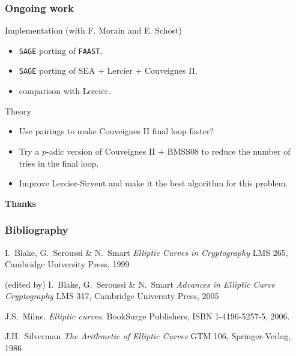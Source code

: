 \documentclass[10pt]{beamer}
\newcommand{\0}{\mathcal{O}}  %
\begin{document}
\begin{frame}
  \frametitle{Ongoing work}

  \begin{block}{Implementation (with F. Morain and E. Schost)}
    \begin{itemize}
    \item \texttt{SAGE} porting of \texttt{FAAST},
    \item \texttt{SAGE} porting of SEA + Lercier + Couveignes II,
    \item comparison with Lercier.
    \end{itemize}
  \end{block}

  \begin{block}{Theory}
    \begin{itemize}
    \item Use pairings to make Couveignes II final loop faster?
    \item Try a $p$-adic version of Couveignes II + BMSS08 to reduce
      the number of tries in the final loop.
    \item Improve Lercier-Sirvent and make it the best algorithm for
      this problem.
    \end{itemize}
  \end{block}
\end{frame}


\begin{frame}
  \begin{center}
    \Large
    \textbf{Thanks}
  \end{center}
\end{frame}


\begin{frame}
  \frametitle{Bibliography}

  \begin{thebibliography}{1}
    \beamertemplatebookbibitems
    
   I.~Blake, G.~Seroussi \& N.~Smart
    \newblock \emph{Elliptic Curves in Cryptography}
    \newblock LMS 265, Cambridge University Press, 1999
    
   (edited by) I.~Blake, G.~Seroussi \& N.~Smart
    \newblock \emph{Advances in Elliptic Curve Cryptography}
    \newblock LMS 317, Cambridge University Press, 2005
        
   J.S.~Milne.
    \newblock \emph{Elliptic curves}.
    \newblock BookSurge Publishers, ISBN 1-4196-5257-5, 2006.

   J.H.~Silverman
    \newblock \emph{The Arithmetic of Elliptic Curves}
    \newblock GTM 106, Springer-Verlag, 1986
        
  \end{thebibliography}
\end{frame}
\end{document}
